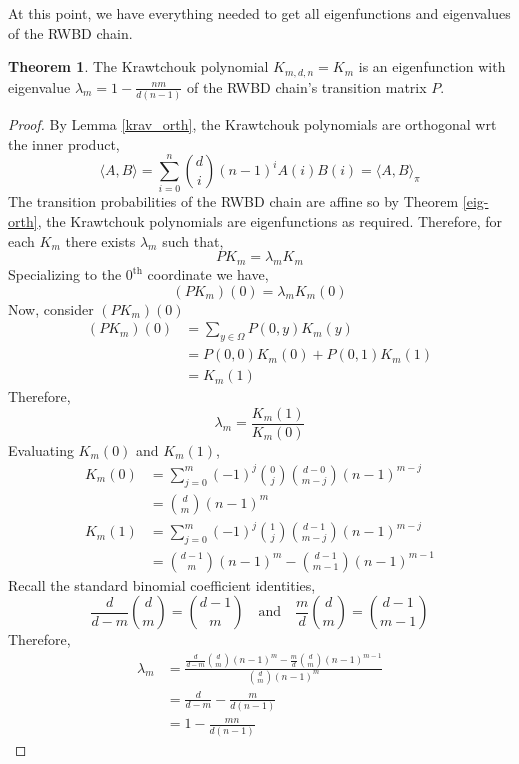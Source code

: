 \documentclass{article}
\theoremstyle{definition}
\theoremstyle{definition}
\newtheorem{theorem}{Theorem}
\theoremstyle{definition}
\theoremstyle{definition}
\theoremstyle{named}
\begin{document}
\noindent At this point, we have everything needed to get all eigenfunctions and eigenvalues of the RWBD chain.
\begin{theorem}
   The Krawtchouk polynomial $K_{m,d,n} = K_m$ is an eigenfunction with eigenvalue $\lambda_m = 1 - \frac{nm}{d(n-1)}$ of the RWBD chain's transition matrix $P$.
   \begin{proof}
      By Lemma \ref{krav_orth}, the Krawtchouk polynomials are orthogonal wrt the inner product,
      \[\langle A,B\rangle = \sum_{i=0}^n {d \choose i}(n-1)^i A(i) B(i)=\langle A,B \rangle_\pi\]
      The transition probabilities of the RWBD chain are affine so by Theorem \ref{eig-orth}, the Krawtchouk polynomials are eigenfunctions as required. Therefore, for each $K_m$ there exists $\lambda_m$ such that,
      \[PK_m = \lambda_m K_m\]
      Specializing to the $0^\text{th}$ coordinate we have,
      \[(PK_m)(0) = \lambda_mK_m(0)\]
      Now, consider $(PK_m)(0)$
      \begin{align*}
      (PK_m)(0) &= \sum_{y\in \Omega} P(0,y)K_m(y)\\
      &= P(0,0)K_m(0)+P(0,1)K_m(1)\\& = K_m(1)
      \end{align*}
      Therefore,
      \[\lambda_m = \frac{K_m(1)}{K_m(0)}\]
      Evaluating $K_m(0)$ and $K_m(1)$,
      \begin{align*}
            K_m(0) &= \sum_{j=0}^{m}{(-1)}^j{0 \choose j}{d-0 \choose m-j}{(n-1)}^{m-j}\\
            &= {d \choose m}{(n-1)}^{m}\\
            K_m(1) &= \sum_{j=0}^{m}{(-1)}^j{1 \choose j}{d-1 \choose m-j}{(n-1)}^{m-j}\\
            &= {d-1 \choose m}(n-1)^m - {d-1 \choose m-1} {(n-1)}^{m-1}
      \end{align*}
      Recall the standard binomial coefficient identities,
      \[\frac{d}{d-m}{d \choose m}={d-1 \choose m} \quad \text{and}\quad \frac{m}{d}{d\choose m} = {d-1 \choose m-1} \]
      Therefore,
      \begin{align*}
         \lambda_m &= \frac{\frac{d}{d-m}{d \choose m}(n-1)^m - \frac{m}{d}{d \choose m} (n-1)^{m-1}}{{d \choose m}(n-1)^{m}}\\
         &= \frac{d}{d-m} - \frac{m}{d(n-1)} \\
         &= 1 - \frac{mn}{d(n-1)}
      \end{align*}
   \end{proof}
\end{theorem}
\end{document}
